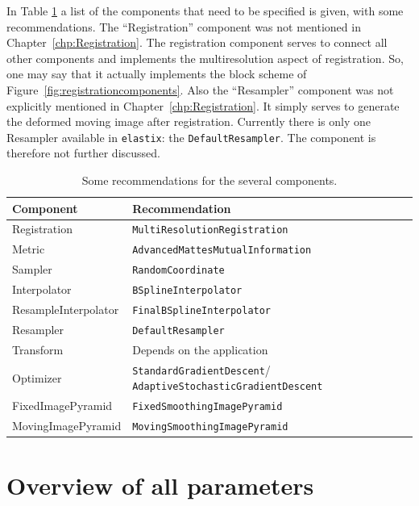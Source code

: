 \documentclass[]{report}
\newcommand{\elastix}{\texttt{elastix}}
\begin{document}
In Table \ref{table:tutorial:components} a list of the components
that need to be specified is given, with some recommendations. The
``Registration'' component was not mentioned in
Chapter~\ref{chp:Registration}. The registration component serves
to connect all other components and implements the multiresolution
aspect of registration. So, one may say that it actually
implements the block scheme of
Figure~\ref{fig:registrationcomponents}. Also the ``Resampler''
component was not explicitly mentioned in
Chapter~\ref{chp:Registration}. It simply serves to generate the
deformed moving image after registration. Currently there is only
one Resampler available in \elastix: the
\texttt{DefaultResampler}. The component is therefore not further
discussed.

\begin{table}[htb]
\centering
\begin{tabular}{l|p{15em}}
\textbf{Component} & \textbf{Recommendation} \\
\hline
Registration & \texttt{MultiResolutionRegistration} \\
Metric       & \texttt{AdvancedMattesMutualInformation} \\
Sampler      & \texttt{RandomCoordinate} \\
Interpolator & \texttt{BSplineInterpolator} \\
ResampleInterpolator & \texttt{FinalBSplineInterpolator} \\
Resampler    & \texttt{DefaultResampler}\\
Transform    & Depends on the application \\
Optimizer    & \texttt{StandardGradientDescent}/ \texttt{AdaptiveStochasticGradientDescent} \\
FixedImagePyramid   & \texttt{FixedSmoothingImagePyramid} \\
MovingImagePyramid  & \texttt{MovingSmoothingImagePyramid} \\
\end{tabular}
\caption{Some recommendations for the several components.}\label{table:tutorial:components}
\end{table}

\section{Overview of all parameters}
\end{document}
